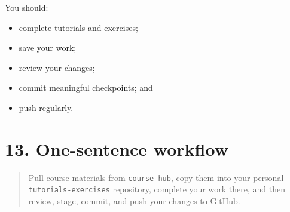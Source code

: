 \documentclass[
  letterpaper,
  DIV=11,
  numbers=noendperiod]{scrartcl}
\providecommand{\tightlist}{%
  \setlength{\itemsep}{0pt}\setlength{\parskip}{0pt}}
\begin{document}
You should:

\begin{itemize}
\tightlist
\item
  complete tutorials and exercises;
\item
  save your work;
\item
  review your changes;
\item
  commit meaningful checkpoints; and
\item
  push regularly.
\end{itemize}

\section{13. One-sentence workflow}\label{one-sentence-workflow}

\begin{quote}
Pull course materials from \texttt{course-hub}, copy them into your
personal \texttt{tutorials-exercises} repository, complete your work
there, and then review, stage, commit, and push your changes to GitHub.
\end{quote}
\end{document}
